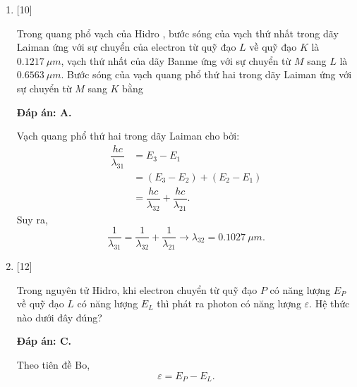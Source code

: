 \begin{enumerate}[label=\bfseries Câu \arabic*:]
	\item {} [10]
	\cauhoi
	{Trong quang phổ vạch của Hidro , bước sóng của vạch thứ nhất trong dãy Laiman ứng với sự chuyển của electron từ quỹ đạo $ L $ về quỹ đạo $ K $ là $ \SI{0,1217}{\mu m} $, vạch thứ nhất của dãy Banme ứng với sự chuyển từ $ M $ sang $ L $  là $ \SI{0,6563}{\mu m} $. Bước sóng của vạch quang phổ thứ hai trong dãy Laiman ứng với sự chuyển từ $ M $ sang $ K $ bằng 
	}
	
	\loigiai
	{		\textbf{Đáp án: A.}
		
		Vạch quang phổ thứ hai trong dãy Laiman cho bởi:
		\begin{align*}
			\dfrac{hc}{\lambda_{31}} &= E_{3} - E_{1} \\ 
			&= \left( E_{3} - E_{2} \right) + \left( E_{2} - E_{1} \right) \\
			&= \dfrac{hc}{\lambda_{32}} + \dfrac{hc}{\lambda_{21}}.
		\end{align*}
		Suy ra,
		\begin{equation*}
			\dfrac{1}{\lambda_{31}} = \dfrac{1}{\lambda_{32}} + \dfrac{1}{\lambda_{21}} \rightarrow \lambda_{32} = \SI{0,1027}{\mu m}.  
		\end{equation*}
	}
	
	\item {} [12]
	\cauhoi
	{Trong nguyên tử Hidro, khi electron chuyển từ quỹ đạo $ P $ có năng lượng $ E_{P} $ về quỹ đạo $ L $ có năng lượng $ E_{L} $ thì phát ra photon có năng lượng $ \varepsilon $. Hệ thức nào dưới đây đúng?
	}
	
	\loigiai
	{		\textbf{Đáp án: C.}
		
		Theo tiên đề Bo,
		\begin{equation}
			\varepsilon = E_{P} - E_{L}. 
		\end{equation}
	}
	

\end{enumerate}

